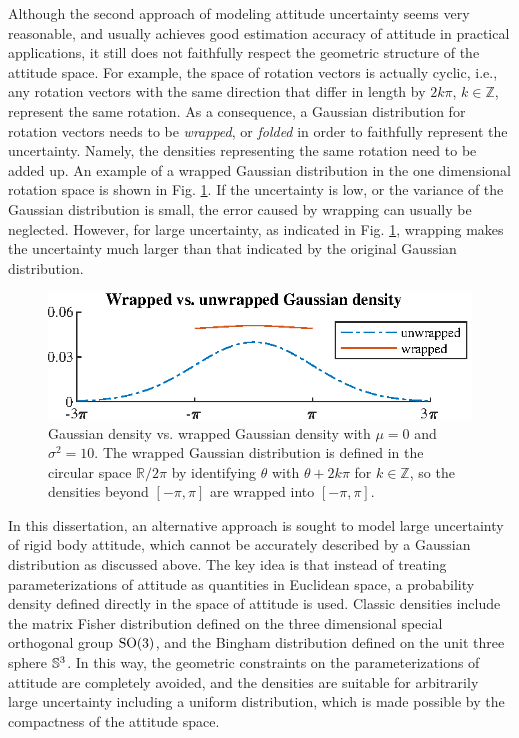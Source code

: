 Although the second approach of modeling attitude uncertainty seems very reasonable, and usually achieves good estimation accuracy of attitude in practical applications, it still does not faithfully respect the geometric structure of the attitude space.
For example, the space of rotation vectors is actually cyclic, i.e., any rotation vectors with the same direction that differ in length by $2k\pi$, $k\in\mathbb{Z}$, represent the same rotation.
As a consequence, a Gaussian distribution for rotation vectors needs to be \textit{wrapped}, or \textit{folded} in order to faithfully represent the uncertainty.
Namely, the densities representing the same rotation need to be added up.
An example of a wrapped Gaussian distribution in the one dimensional rotation space is shown in Fig. \ref{fig:wrapping}.
If the uncertainty is low, or the variance of the Gaussian distribution is small, the error caused by wrapping can usually be neglected.
However, for large uncertainty, as indicated in Fig. \ref{fig:wrapping}, wrapping makes the uncertainty much larger than that indicated by the original Gaussian distribution.

\begin{figure}
	\centering
	\includegraphics[scale=1.2]{figures/wrapping}
	\caption[Gaussian density vs. wrapped Gaussian density.]{Gaussian density vs. wrapped Gaussian density with $\mu=0$ and $\sigma^2=10$.
		The wrapped Gaussian distribution is defined in the circular space $\mathbb{R}/2\pi$ by identifying $\theta$ with $\theta+2k\pi$ for $k\in\mathbb{Z}$, so the densities beyond $[-\pi,\pi]$ are wrapped into $[-\pi,\pi]$. \label{fig:wrapping}}
\end{figure}

In this dissertation, an alternative approach is sought to model large uncertainty of rigid body attitude, which cannot be accurately described by a Gaussian distribution as discussed above.
The key idea is that instead of treating parameterizations of attitude as quantities in Euclidean space, a probability density defined directly in the space of attitude is used.
Classic densities include the matrix Fisher distribution defined on the three dimensional special orthogonal group $\mathrm{SO}(3)$, and the Bingham distribution defined on the unit three sphere $\mathbb{S}^3$.
In this way, the geometric constraints on the parameterizations of attitude are completely avoided, and the densities are suitable for arbitrarily large uncertainty including a uniform distribution, which is made possible by the compactness of the attitude space.


